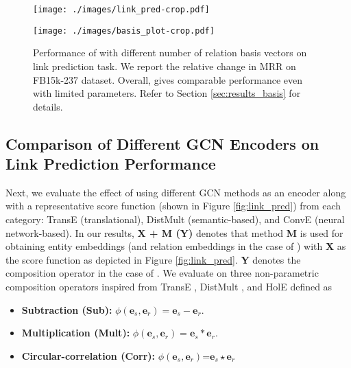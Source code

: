 \documentclass{article} \usepackage{iclr2020_conference,times}
\begin{document}
\begin{figure*}[t]
	\centering
	\begin{minipage}{.485\textwidth}
		\centering
		\texttt{[image: ./images/link\_pred-crop.pdf]}
		\caption{\label{fig:link_pred} \small Knowledge Graph link prediction with \method{} and other methods. \method{} generates both entity and relation embedding as opposed to just entity embeddings for other models. For more details, please refer to Section \ref{sec:results_gcn_encoder}}
	\end{minipage} \quad
	\begin{minipage}{0.47\textwidth}
		\centering
		\texttt{[image: ./images/basis\_plot-crop.pdf]}
		\caption{\label{fig:basis_plot} \small Performance of \method{} with different number of relation basis vectors on link prediction task. We report the relative change in MRR on FB15k-237 dataset. Overall, \method{} gives comparable performance even with limited parameters. Refer to Section \ref{sec:results_basis} for details.}
	\end{minipage} \vspace{-4mm}
\end{figure*}

\vspace{-1mm}
\subsection{Comparison of Different GCN Encoders on Link Prediction Performance}
\label{sec:results_gcn_encoder}
\vspace{-1mm}

Next, we evaluate the effect of using different GCN methods as an encoder along with a representative score function (shown in Figure \ref{fig:link_pred}) from each category: TransE (translational), DistMult (semantic-based), and ConvE (neural network-based).  In our results, \textbf{X + M (Y)}  denotes that method \textbf{M} is used for obtaining entity embeddings (and relation embeddings in the case of \method{}) with \textbf{X} as the score function as depicted in Figure \ref{fig:link_pred}. \textbf{Y} denotes the composition operator in the case of \method{}. We evaluate \method{} on three non-parametric composition operators inspired from TransE \citep{transe}, DistMult \citep{distmult}, and HolE \citep{hole} defined as
\begin{itemize}[itemsep=1pt,topsep=1pt,parsep=0pt,partopsep=0pt,leftmargin=5.5mm]
	\item \textbf{Subtraction (Sub):} $\phi(\bm{e}_s, \bm{e}_r) = \bm{e}_s - \bm{e}_r.$
	\item \textbf{Multiplication (Mult):} $\phi(\bm{e}_s, \bm{e}_r) = \bm{e}_s * \bm{e}_r.$
	\item \textbf{Circular-correlation (Corr):} $\phi(\bm{e}_s, \bm{e}_r) \text{=} \bm{e}_s \star \bm{e}_r$
\end{itemize}
\end{document}
